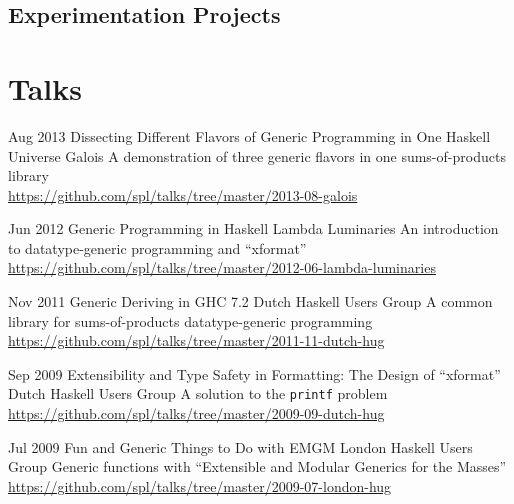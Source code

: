 \documentclass[11pt,a4paper,roman]{moderncv}
\begin{document}
\subsection{Experimentation Projects}




\nocite{*}




\section{Talks}

\cventry%
{Aug 2013}%
{Dissecting Different Flavors of Generic Programming in One Haskell Universe}%
{Galois}%
{\portland}%
{}%
{A demonstration of three generic flavors in one sums-of-products library
\\
\url{https://github.com/spl/talks/tree/master/2013-08-galois}}

\cventry%
{Jun 2012}%
{Generic Programming in Haskell}%
{Lambda Luminaries}%
{\centurion}%
{}%
{An introduction to datatype-generic programming and ``xformat''
\\
\url{https://github.com/spl/talks/tree/master/2012-06-lambda-luminaries}}

\cventry%
{Nov 2011}%
{Generic Deriving in GHC 7.2}%
{Dutch Haskell Users Group}%
{\utrecht}%
{}%
{A common library for sums-of-products datatype-generic programming
\\
\url{https://github.com/spl/talks/tree/master/2011-11-dutch-hug}}

\cventry%
{Sep 2009}%
{Extensibility and Type Safety in Formatting: The Design of ``xformat''}%
{Dutch Haskell Users Group}%
{\utrecht}%
{}%
{A solution to the \texttt{printf} problem
\\
\url{https://github.com/spl/talks/tree/master/2009-09-dutch-hug}}

\cventry%
{Jul 2009}%
{Fun and Generic Things to Do with EMGM}%
{London Haskell Users Group}%
{\london}%
{}%
{Generic functions with ``Extensible and Modular Generics for the Masses''
\\
\url{https://github.com/spl/talks/tree/master/2009-07-london-hug}}
\end{document}

